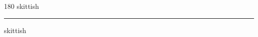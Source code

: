 
\begin{frame}
\begin{center}
\begin{turn}{180}
{\fontsize{2.5cm}{1em}\selectfont skittish}
\end{turn}
\vspace{1em}\par  
\hrule
\vspace{1em}\par  
{\fontsize{2.5cm}{1em}\selectfont skittish}
\end{center}
\end{frame}
